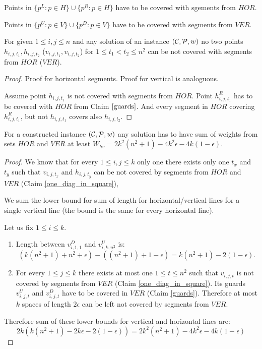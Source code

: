 \begin{claim}
\label{guards}
Points in $\{p^L : p \in H\} \cup \{p^R : p \in H\}$
have to be covered with sgements from $HOR$.

Points in $\{p^U : p \in V\} \cup \{p^D : p \in V\} $
have to be covered with segments from $VER$.
\end{claim}


\begin{claim}
\label{one_diag_in_square}
For given $1 \le i, j \le n$
and any solution of an instance $(\mathcal{C}, \mathcal{P}, w)$
no two points $h_{i, j, t_1}, h_{i, j, t_2}$
($v_{i, j, t_1}, v_{i, j, t_2}$)
for $1 \le t_1 < t_2 \le n^2$
can be not covered with segments from $HOR$ ($VER$).
\end{claim}

\begin{proof}
Proof for horizontal segments. Proof for vertical is analoguous.

Assume point $h_{i, j, t_1}$ is not covered with
segments from $HOR$.
Point $h^R_{i, j, t_1}$ has to be covered with $HOR$
from Claim $\ref{guards}$.
And every segment in $HOR$ covering $h^R_{i, j, t_1}$,
but not $h_{i,j,t_1}$ covers also $h_{i, j, t_2}$.
\end{proof}

\begin{lemma}
\label{vertical_horizontal_sum}
For a constructed instance $(\mathcal{C}, \mathcal{P}, w)$
any solution has to have sum of weights from sets $HOR$ and $VER$ at least
$W_{hv} = 2k^2(n^2+1) -4k^2\epsilon -4k(1-\epsilon)$.
\end{lemma}

\begin{proof}
We know that for every $1 \le i,j \le k$
only one there exists only one $t_x$ and $t_y$ such that
$v_{i,j,t_x}$ and $h_{i,j,t_y}$
can be not covered by
segments from $HOR$ and $VER$ (Claim \ref{one_diag_in_square}),


We sum the lower bound for sum of length for horizontal/vertical
lines for a single vertical line
(the bound is the same for every horizontal line).

Let us fix $1 \le i \le k$.

\begin{enumerate}[label={(\arabic*)}]
\item Length between $v^D_{i, 1, 1}$ and $v^U_{i, k, n^2}$ is:
$$(k(n^2+1) + n^2 +\epsilon) - ((n^2+1)+1 -\epsilon) = k(n^2+1) - 2(1 - \epsilon).$$

\item For every $1 \le j \le k$ there exists at most one $1 \le t \le n^2$
such that $v_{i,j,t}$ is not covered by segments from $VER$
(Claim \ref{one_diag_in_square}).
Its guards $v^U_{i,j,t}$ and $v^D_{i,j,t}$
have to be covered in $VER$ (Claim \ref{guards}).
Therefore at most $k$ spaces of length $2\epsilon$ can be left
not covered by segments from $VER$.

\end{enumerate}
Therefore sum of these lower bounds for vertical and horizontal lines are:
$$2k(k(n^2+1) -2k\epsilon -2(1-\epsilon)) = 2k^2(n^2+1) -4k^2\epsilon -4k(1-\epsilon)$$
\end{proof}

